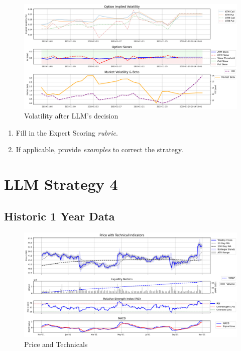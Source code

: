 \documentclass[8pt]{scrartcl}
\begin{document}
\begin{figure}[H]
    \centering
    \includegraphics[width=1\linewidth]{judge_reviews/GOOGL_M_gpt-4o-mini/2019-11-04/llm_Market_Volatility_&_Beta.png}
    \caption{Volatility after LLM's decision}
\end{figure}

\begin{tcolorbox}[colback=blue!10, colframe=blue!60, title=\textbf{TASKS}, sharp corners=southwest]
\begin{enumerate}
    \item Fill in the Expert Scoring \textit{rubric}.
    \item If applicable, provide \textit{examples} to correct the strategy.
\end{enumerate}
\end{tcolorbox}

\newpage


\section*{LLM Strategy 4}
\label{app:s4}

\subsection*{Historic 1 Year Data}

\begin{figure}[H]
    \centering
    \includegraphics[width=1\linewidth]{judge_reviews/MSFT_M_gpt-4o-mini/2015-11-02/judge_Price_with_Technical_Indicators.png}
    \caption{Price and Technicals}
\end{figure}
\end{document}
